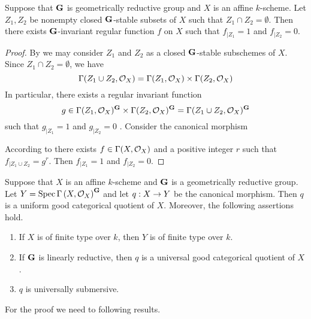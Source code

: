 \begin{proposition}\label{proposition:invariant_functions_separate_closed_sets_for_geometrically_reductive}
Suppose that $\mathbf{G}$ is geometrically reductive group and $X$ is an affine $k$-scheme. Let $Z_1,Z_2$ be nonempty closed $\mathbf{G}$-stable subsets of $X$ such that $Z_1\cap Z_2 = \emptyset$. Then there exists $\mathbf{G}$-invariant regular function $f$ on $X$ such that $f_{\mid Z_1} = 1$ and $f_{\mid Z_2} = 0$.
\end{proposition}
\begin{proof}
By {\cite[Corollary 5.4]{Algebraic_groups}} we may consider $Z_1$ and $Z_2$ as a closed $\mathbf{G}$-stable subschemes of $X$. Since $Z_1\cap Z_2 = \emptyset$, we have 
$$\Gamma(Z_1\cup Z_2,{\mathcal O}_X) = \Gamma(Z_1,{\mathcal O}_X)\times \Gamma(Z_2,{\mathcal O}_X)$$
In particular, there exists a regular invariant function 
$$g \in \Gamma(Z_1,{\mathcal O}_X)^{\mathbf{G}}\times \Gamma(Z_2,{\mathcal O}_X)^{\mathbf{G}} = \Gamma(Z_1\cup Z_2,{\mathcal O}_X)^{\mathbf{G}}$$
such that $g_{\mid Z_1} = 1$ and $g_{\mid Z_2} = 0$
. Consider the canonical morphism
\begin{center}
\end{center}
According to {\cite[Theorem 2.4]{Geometrically_reductive_and_Nagata}} there exists $f\in \Gamma(X,{\mathcal O}_X)$ and a positive integer $r$ such that $f_{\mid Z_1\cup Z_2} = g^r$. Then $f_{\mid Z_1} = 1$ and $f_{\mid Z_2}=0$.
\end{proof}

\begin{theorem}\label{theorem:Mumfords_theorem_for_good_affine_quotients}
Suppose that $X$ is an affine $k$-scheme and $\mathbf{G}$ is a geometrically reductive group. Let $Y = \mathrm{Spec}\, \Gamma\left(X,{\mathcal O}_X\right)^{\mathbf{G}}$ and let $q:X\rightarrow Y$ be the canonical morphism. Then $q$ is a uniform good categorical quotient of $X$. Moreover, the following assertions hold. 
\begin{enumerate}[label=\emph{\textbf{(\arabic*)}}, leftmargin=3.0em]
\item If $X$ is of finite type over $k$, then $Y$ is of finite type over $k$.
\item If $\mathbf{G}$ is linearly reductive, then $q$ is a universal good categorical quotient of $X$.
\item $q$ is universally submersive.
\end{enumerate}
\end{theorem}
\noindent
For the proof we need to following results.

